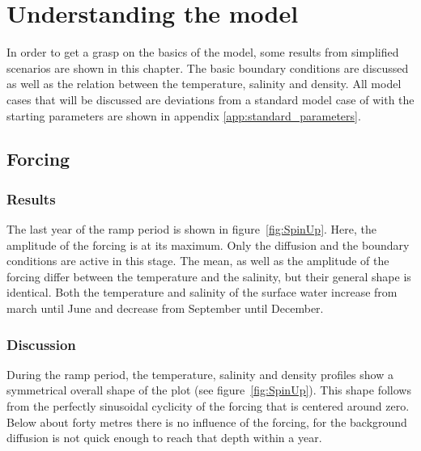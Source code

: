 \documentclass[twocolumn]{article}
\begin{document}

\section{Understanding the model}
In order to get a grasp on the basics of the model, some results from simplified scenarios are shown in this chapter. The basic boundary conditions are discussed as well as the relation between the temperature, salinity and density. All model cases that will be discussed are deviations from a standard model case of with the starting parameters are shown in appendix \ref{app:standard_parameters}.

\subsection{Forcing}
\subsubsection{Results}
The last year of the ramp period is shown in figure~\ref{fig:SpinUp}. Here, the amplitude of the forcing is at its maximum. Only the diffusion and the boundary conditions are active in this stage. 
The mean, as well as the amplitude of the forcing differ between the temperature and the salinity, but their general shape is identical. Both the temperature and salinity of the surface water increase from march until June and decrease from September until December. 

\subsubsection{Discussion}
During the ramp period, the temperature, salinity and density profiles show a symmetrical overall shape of the plot (see figure~\ref{fig:SpinUp}). This shape follows from the perfectly sinusoidal cyclicity of the forcing that is centered around zero. Below about forty metres there is no influence of the forcing, for the background diffusion is not quick enough to reach that depth within a year. 
\end{document}
